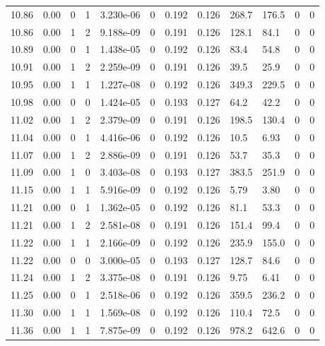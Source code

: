 \documentclass[preview]{standalone}
\begin{document}
{{{{{{{{\begin{tabular}{L{1.2cm}C{1.2cm} C{0.3cm}C{0.5cm} C{1.4cm}C{1.4cm} C{1.4cm}C{1.4cm} C{1.6cm}C{1.6cm} C{1.6cm}C{1.6cm}}
  10.86  &  0.00  & 0     &  1 &  3.230e-06  & 0  &  0.192&   0.126& 268.7 & 176.5   &  0 & 0  \\ 
  10.86  &  0.00  & 1     &  2 &  9.188e-09  & 0  &  0.191&   0.126& 128.1 & 84.1   &  0 & 0  \\ 
  10.89  &  0.00  & 0     &  1 &  1.438e-05  & 0  &  0.192&   0.126& 83.4 & 54.8   &  0 & 0  \\ 
  10.91  &  0.00  & 1     &  2 &  2.259e-09  & 0  &  0.191&   0.126& 39.5 & 25.9   &  0 & 0  \\ 
  10.95  &  0.00  & 1     &  1 &  1.227e-08  & 0  &  0.192&   0.126& 349.3 & 229.5   &  0 & 0  \\ 
  10.98  &  0.00  & 0     &  0 &  1.424e-05  & 0  &  0.193&   0.127& 64.2 & 42.2   &  0 & 0  \\ 
  11.02  &  0.00  & 1     &  2 &  2.379e-09  & 0  &  0.191&   0.126& 198.5 & 130.4   &  0 & 0  \\ 
  11.04  &  0.00  & 0     &  1 &  4.416e-06  & 0  &  0.192&   0.126& 10.5 & 6.93   &  0 & 0  \\ 
  11.07  &  0.00  & 1     &  2 &  2.886e-09  & 0  &  0.191&   0.126& 53.7 & 35.3   &  0 & 0  \\ 
  11.09  &  0.00  & 1     &  0 &  3.403e-08  & 0  &  0.193&   0.127& 383.5 & 251.9   &  0 & 0  \\ 
  11.15  &  0.00  & 1     &  1 &  5.916e-09  & 0  &  0.192&   0.126& 5.79 & 3.80   &  0 & 0  \\ 
  11.21  &  0.00  & 0     &  1 &  1.362e-05  & 0  &  0.192&   0.126& 81.1 & 53.3   &  0 & 0  \\ 
  11.21  &  0.00  & 1     &  2 &  2.581e-08  & 0  &  0.191&   0.126& 151.4 & 99.4   &  0 & 0  \\ 
  11.22  &  0.00  & 1     &  1 &  2.166e-09  & 0  &  0.192&   0.126& 235.9 & 155.0   &  0 & 0  \\ 
  11.22  &  0.00  & 0     &  0 &  3.000e-05  & 0  &  0.193&   0.127& 128.7 & 84.6   &  0 & 0  \\ 
  11.24  &  0.00  & 1     &  2 &  3.375e-08  & 0  &  0.191&   0.126& 9.75 & 6.41   &  0 & 0  \\ 
  11.25  &  0.00  & 0     &  1 &  2.518e-06  & 0  &  0.192&   0.126& 359.5 & 236.2   &  0 & 0  \\ 
  11.30  &  0.00  & 1     &  1 &  1.569e-08  & 0  &  0.192&   0.126& 110.4 & 72.5   &  0 & 0  \\ 
  11.36  &  0.00  & 1     &  1 &  7.875e-09  & 0  &  0.192&   0.126& 978.2 & 642.6   &  0 & 0  \\ 

\end{tabular}}}}}}}}}
\end{document}
